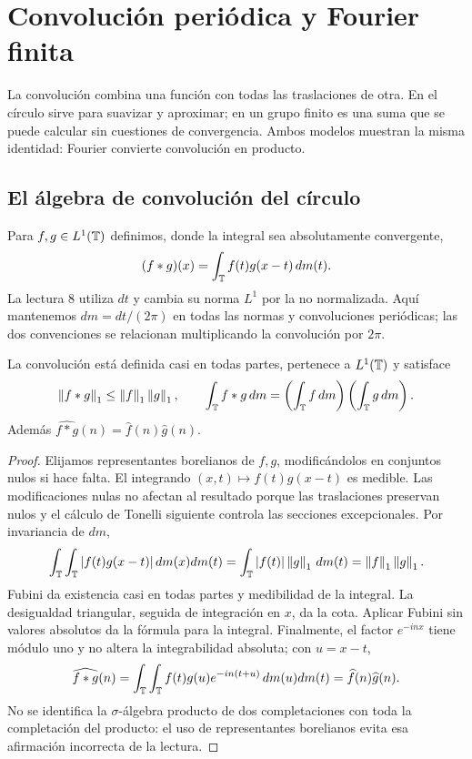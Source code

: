 \chapter{Convolución periódica y Fourier finita}\label{cap:v4-05}
La convolución combina una función con todas las traslaciones de otra. En el círculo sirve para suavizar y aproximar; en un grupo finito es una suma que se puede calcular sin cuestiones de convergencia. Ambos modelos muestran la misma identidad: Fourier convierte convolución en producto.

\section{El álgebra de convolución del círculo}\label{lectura:v4-08}
Para $f,g\in L^1(\mathbb T)$ definimos, donde la integral sea absolutamente convergente,
\[
 (f*g)(x)=\int_\mathbb T f(t)g(x-t)\,dm(t).
\]
La lectura 8 utiliza $dt$ y cambia su norma $L^1$ por la no normalizada. Aquí mantenemos $dm=dt/(2\pi)$ en todas las normas y convoluciones periódicas; las dos convenciones se relacionan multiplicando la convolución por $2\pi$.
\begin{teorema}\label{v4:conv-T}
La convolución está definida casi en todas partes, pertenece a $L^1(\mathbb T)$ y satisface
\[
 \left\lVert f*g\right\rVert_1\leq\left\lVert f\right\rVert_1\left\lVert g\right\rVert_1,\qquad
 \int_\mathbb T f*g\,dm=\left(\int_\mathbb T f\,dm\right)\left(\int_\mathbb T g\,dm\right).
\]
Además $\widehat{f*g}(n)=\widehat f(n)\widehat g(n)$.
\end{teorema}
\begin{proof}
Elijamos representantes borelianos de $f,g$, modificándolos en conjuntos nulos si hace falta. El integrando $(x,t)\mapsto f(t)g(x-t)$ es medible. Las modificaciones nulas no afectan al resultado porque las traslaciones preservan nulos y el cálculo de Tonelli siguiente controla las secciones excepcionales. Por invariancia de $dm$,
\[
 \int_\mathbb T\int_\mathbb T |f(t)g(x-t)|\,dm(x)dm(t)
 =\int_\mathbb T|f(t)|\left\lVert g\right\rVert_1\,dm(t)=\left\lVert f\right\rVert_1\left\lVert g\right\rVert_1.
\]
Fubini da existencia casi en todas partes y medibilidad de la integral. La desigualdad triangular, seguida de integración en $x$, da la cota. Aplicar Fubini sin valores absolutos da la fórmula para la integral. Finalmente, el factor $e^{-inx}$ tiene módulo uno y no altera la integrabilidad absoluta; con $u=x-t$,
\[
 \widehat{f*g}(n)=\int_\mathbb T\int_\mathbb T f(t)g(u)e^{-in(t+u)}\,dm(u)dm(t)
 =\widehat f(n)\widehat g(n).
\]
No se identifica la $\sigma$-álgebra producto de dos completaciones con toda la completación del producto: el uso de representantes borelianos evita esa afirmación incorrecta de la lectura.
\end{proof}

